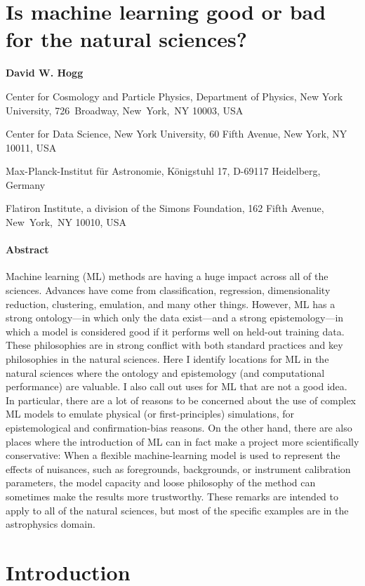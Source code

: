 \documentclass[11pt]{article}
\renewcommand{\author}[1]{\medskip\par\noindent\textbf{#1}}
\newcommand{\affil}[1]{{\footnotesize\par\noindent #1 \par}}
\begin{document}
\section*{Is machine learning good or bad for the natural sciences?}

\author{David W. Hogg}
\affil{Center for Cosmology and Particle Physics, Department of Physics, New York University, 726~Broadway, New~York,~NY 10003, USA}
\affil{Center for Data Science, New York University, 60 Fifth Avenue, New York, NY 10011, USA}
\affil{Max-Planck-Institut f{\"u}r Astronomie, K{\"o}nigstuhl 17, D-69117 Heidelberg, Germany}
\affil{Flatiron Institute, a division of the Simons Foundation, 162 Fifth Avenue, New~York,~NY 10010, USA}

\paragraph{Abstract}
  Machine learning (ML) methods are having a huge impact across all of the sciences.
  Advances have come from classification, regression, dimensionality reduction, clustering, emulation, and many other things.
  However, ML has a strong ontology---in which only the data exist---and a strong epistemology---in which a model is considered good if it performs well on held-out training data.
  These philosophies are in strong conflict with both standard practices and key philosophies in the natural sciences.
  Here I identify locations for ML in the natural sciences where the ontology and epistemology (and computational performance) are valuable.
  I also call out uses for ML that are not a good idea.
  In particular, there are a lot of reasons to be concerned about the use of complex ML models to emulate physical (or first-principles) simulations, for epistemological and confirmation-bias reasons.
  On the other hand, there are also places where the introduction of ML can in fact make a project more scientifically conservative:
  When a flexible machine-learning model is used to represent the effects of nuisances, such as foregrounds, backgrounds, or instrument calibration parameters, the model capacity and loose philosophy of the method can sometimes make the results more trustworthy.
  These remarks are intended to apply to all of the natural sciences, but most of the specific examples are in the astrophysics domain.

\section{Introduction}\label{sec:intro}
\end{document}
